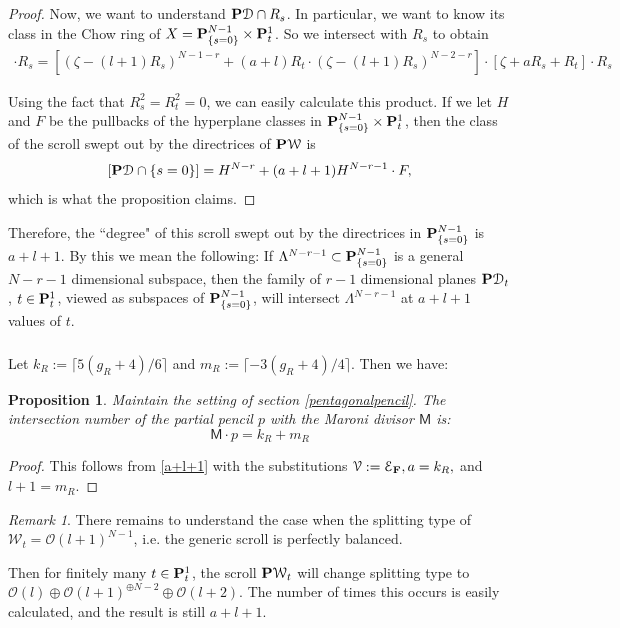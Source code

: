\documentclass[reqno, 10 pt]{article}
\newtheorem{prop}[thm]{Proposition}
\theoremstyle{definition}
\theoremstyle{remark}
\newtheorem{rmk}[thm]{Remark}
\numberwithin{equation}{section}
\numberwithin{thm}{section}
\numberwithin{prop}{section}
\numberwithin{lem}{section}
\numberwithin{cor}{section}
\numberwithin{conj}{section}
\numberwithin{defn}{section}
\newcommand{\F}{{\mathbf F}}
\newcommand{\sfM}{{\mathsf M}}
\renewcommand{\cD}{{\mathcal D}}
\newcommand{\cE}{{\mathcal E}}
\newcommand{\cO}{{\mathcal O}}
\newcommand{\cV}{{\mathcal V}}
\newcommand{\cW}{{\mathcal W}}
\renewcommand{\P}{{\bf P}}
\renewcommand{\F}{{\bf F}}
\begin{document}
\begin{proof}
Now, we want to understand ${\bf P}\cD \cap R_s$. In particular, we want to know its class in the Chow ring of $X = {\bf P}^{N-1}_{\{s=0\}} \times {\bf P}^1_t$. So we intersect with $R_{s}$ to obtain
\begin{eqnarray*}
[{\bf P}\cD] \cdot R_s = [\left( \zeta - (l+1)R_s\right)^{N-1-r} + (a+l)R_t\cdot ( \zeta - (l+1)R_s)^{N-2-r}]\cdot  [\zeta + aR_s+R_t]\cdot R_s
\end{eqnarray*}

Using the fact that $R_s^2 = R_t^2=0$, we can easily calculate this product. If we let $H$ and $F$ be the pullbacks of the hyperplane classes in ${\bf P}^{N-1}_{\{s=0\}} \times {\bf P}^1_{t}$, then the class of the scroll swept out by the directrices of $\P \cW$ is \[ [{\bf P}\cD \cap \{s=0\}] = H^{N-r} + (a+l+1)H^{N-r-1}\cdot F,\] which is what the proposition claims.
\end{proof}
Therefore, the ``degree" of this scroll swept out by the directrices in ${\bf P}^{N-1}_{\{s=0\}}$ is $a+l+1$.  By this we mean the following:  If $\Lambda^{N-r-1} \subset \P^{N-1}_{\{s=0\}}$ is a general $N-r-1$ dimensional subspace, then the family of $r-1$ dimensional planes $\P \cD_{t}$, $t \in \P^{1}_{t}$, viewed as subspaces of $\P^{N-1}_{\{s=0\}}$, will intersect $\Lambda^{N-r-1}$ at $a+l+1$ values of $t$.  

\subsubsection{} 
Let $k_{R} := \lceil 5(g_{R}+4)/6 \rceil$ and $m_{R} :=  \lceil -3(g_{R}+4)/4 \rceil$.  Then we have:

\begin{prop}\label{Mp}
Maintain the setting of section \ref{pentagonalpencil}.  The intersection number of the partial pencil $p$ with the Maroni divisor $\sfM$ is:
\[\sfM \cdot p = k_{R} + m_{R}\]
\end{prop}

\begin{proof}
This follows from \autoref{a+l+1} with the substitutions $\cV := \cE_{\F}, a = k_{R},$ and $l+1 = m_{R}$. 
\end{proof}

\begin{rmk}
There remains to understand the case when the splitting type of $\cW_{t} = \cO(l+1)^{N-1}$, i.e. the generic scroll is perfectly balanced. 

Then for finitely many $t \in \P^{1}_{t}$, the scroll $\P \cW_{t}$ will change splitting type to $\cO(l)\oplus \cO(l+1)^{\oplus N-2} \oplus \cO(l+2)$. The number of times this occurs is easily calculated, and the result is still $a+l+1$.
\end{rmk}
\end{document}
